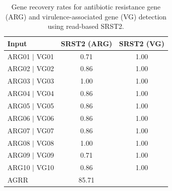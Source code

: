 \begin{table}[!ht]
\centering
\caption{Gene recovery rates for antibiotic resistance gene (ARG) and virulence-associated gene (VG) detection using read-based SRST2.}
\label{tab:Table4}

\begin{tabular}[t]{lcc}
\toprule
Input & SRST2 (ARG) & SRST2 (VG)\\
\midrule
ARG01 $\mid$ VG01 & 0.71 & 1.00\\
ARG02 $\mid$ VG02 & 0.86 & 1.00\\
ARG03 $\mid$ VG03 & 1.00 & 1.00\\
ARG04 $\mid$ VG04 & 0.86 & 1.00\\
ARG05 $\mid$ VG05 & 0.86 & 1.00\\
\addlinespace
ARG06 $\mid$ VG06 & 0.86 & 1.00\\
ARG07 $\mid$ VG07 & 0.86 & 1.00\\
ARG08 $\mid$ VG08 & 1.00 & 1.00\\
ARG09 $\mid$ VG09 & 0.71 & 1.00\\
ARG10 $\mid$ VG10 & 0.86 & 1.00\\
\addlinespace
AGRR & 85.71%
\bottomrule
\end{tabular}
\end{table}
